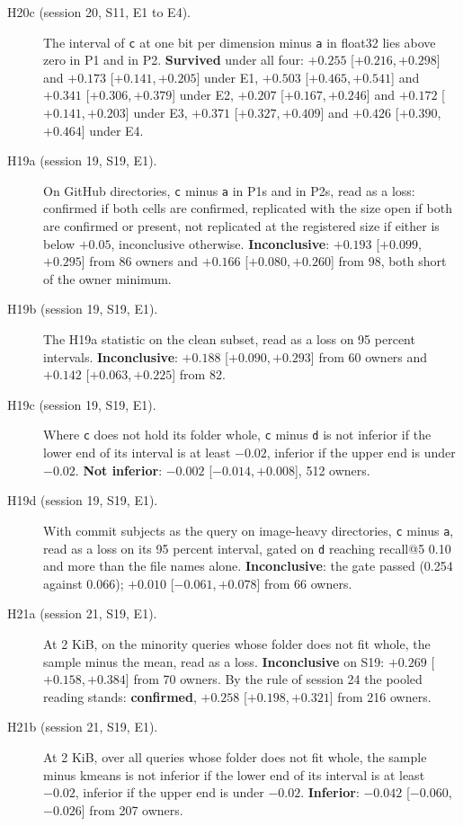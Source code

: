 \documentclass[11pt]{article}
\newcommand{\rep}[1]{\texttt{#1}}
\newcommand{\ci}[2]{[\ensuremath{#1},\,\ensuremath{#2}]}  %
\begin{document}
\begin{description}
\item[H20c (session 20, S11, E1 to E4).] The interval of \rep{c} at one bit per dimension minus \rep{a} in float32 lies above zero in P1 and in P2. \textbf{Survived} under all four: $+0.255$ \ci{+0.216}{+0.298} and $+0.173$ \ci{+0.141}{+0.205} under E1, $+0.503$ \ci{+0.465}{+0.541} and $+0.341$ \ci{+0.306}{+0.379} under E2, $+0.207$ \ci{+0.167}{+0.246} and $+0.172$ \ci{+0.141}{+0.203} under E3, $+0.371$ \ci{+0.327}{+0.409} and $+0.426$ \ci{+0.390}{+0.464} under E4.
\item[H19a (session 19, S19, E1).] On GitHub directories, \rep{c} minus \rep{a} in P1s and in P2s, read as a loss: confirmed if both cells are confirmed, replicated with the size open if both are confirmed or present, not replicated at the registered size if either is below $+0.05$, inconclusive otherwise. \textbf{Inconclusive}: $+0.193$ \ci{+0.099}{+0.295} from 86 owners and $+0.166$ \ci{+0.080}{+0.260} from 98, both short of the owner minimum.
\item[H19b (session 19, S19, E1).] The H19a statistic on the clean subset, read as a loss on 95 percent intervals. \textbf{Inconclusive}: $+0.188$ \ci{+0.090}{+0.293} from 60 owners and $+0.142$ \ci{+0.063}{+0.225} from 82.
\item[H19c (session 19, S19, E1).] Where \rep{c} does not hold its folder whole, \rep{c} minus \rep{d} is not inferior if the lower end of its interval is at least $-0.02$, inferior if the upper end is under $-0.02$. \textbf{Not inferior}: $-0.002$ \ci{-0.014}{+0.008}, 512 owners.
\item[H19d (session 19, S19, E1).] With commit subjects as the query on image-heavy directories, \rep{c} minus \rep{a}, read as a loss on its 95 percent interval, gated on \rep{d} reaching recall@5 0.10 and more than the file names alone. \textbf{Inconclusive}: the gate passed (0.254 against 0.066); $+0.010$ \ci{-0.061}{+0.078} from 66 owners.
\item[H21a (session 21, S19, E1).] At 2 KiB, on the minority queries whose folder does not fit whole, the sample minus the mean, read as a loss. \textbf{Inconclusive} on S19: $+0.269$ \ci{+0.158}{+0.384} from 70 owners. By the rule of session 24 the pooled reading stands: \textbf{confirmed}, $+0.258$ \ci{+0.198}{+0.321} from 216 owners.
\item[H21b (session 21, S19, E1).] At 2 KiB, over all queries whose folder does not fit whole, the sample minus kmeans is not inferior if the lower end of its interval is at least $-0.02$, inferior if the upper end is under $-0.02$. \textbf{Inferior}: $-0.042$ \ci{-0.060}{-0.026} from 207 owners.

\end{description}
\end{document}
